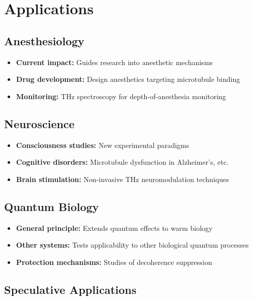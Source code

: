 \section{Applications}

\subsection{Anesthesiology}

\begin{itemize}
\item \textbf{Current impact:} Guides research into anesthetic mechanisms
\item \textbf{Drug development:} Design anesthetics targeting microtubule binding
\item \textbf{Monitoring:} THz spectroscopy for depth-of-anesthesia monitoring
\end{itemize}

\subsection{Neuroscience}

\begin{itemize}
\item \textbf{Consciousness studies:} New experimental paradigms
\item \textbf{Cognitive disorders:} Microtubule dysfunction in Alzheimer's, etc.
\item \textbf{Brain stimulation:} Non-invasive THz neuromodulation techniques
\end{itemize}

\subsection{Quantum Biology}

\begin{itemize}
\item \textbf{General principle:} Extends quantum effects to warm biology
\item \textbf{Other systems:} Tests applicability to other biological quantum processes
\item \textbf{Protection mechanisms:} Studies of decoherence suppression
\end{itemize}

\subsection{Speculative Applications}

